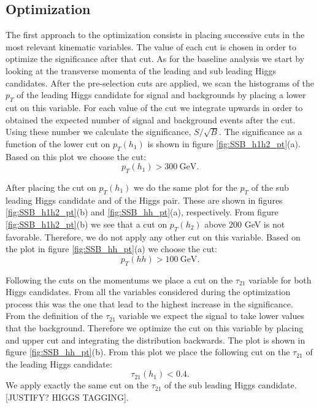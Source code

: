 \subsection{Optimization}
\label{sec:opt}



The first approach to the optimization consists in placing successive cuts in the most relevant kinematic variables. The value of each cut is chosen in order to optimize the significance after that cut. As for the baseline analysis we start by looking at the transverse momenta of the leading and sub leading Higgs candidates. After the pre-selection cuts are applied, we scan the histograms of the $p_T$ of the leading Higgs candidate for signal and backgrounds by placing a lower cut on this variable. For each value of the cut we integrate upwards in order to obtained the expected number of signal and background events after the cut. Using these number we calculate the significance, $S/\sqrt{B}$. The significance as a function of the lower cut on $p_T(h_1)$ is shown in figure \ref{fig:SSB_h1h2_pt}(a). Based on this plot we choose the cut:	
\begin{equation}
	p_T(h_1)>300~\text{GeV}.
\end{equation}

After placing the cut on $p_T(h_1)$ we do the same plot for the $p_T$ of the sub leading Higgs candidate and of the Higgs pair. These are shown in figures \ref{fig:SSB_h1h2_pt}(b) and \ref{fig:SSB_hh_pt}(a), respectively. From figure \ref{fig:SSB_h1h2_pt}(b) we see that a cut on $p_T(h_2)$ above $200$ GeV is not favorable. Therefore, we do not apply any other cut on this variable. Based on the plot in figure \ref{fig:SSB_hh_pt}(a) we choose the cut:
\begin{equation}
	p_T(hh)>100~\text{GeV}.
\end{equation}

Following the cuts on the momentums we place a cut on the $\tau_{21}$ variable for both Higgs candidates. From all the variables considered during the optimization process this was the one that lead to the highest increase in the significance. From the definition of the $\tau_{21}$ variable we expect the signal to take lower values that the background. Therefore we optimize the cut on this variable by placing and upper cut and integrating the distribution backwards. The plot is shown in figure \ref{fig:SSB_hh_pt}(b). From this plot we place the following cut on the $\tau_{21}$ of the leading Higgs candidate:
\begin{equation}
	\tau_{21}(h_1)<0.4.
\end{equation}
We apply exactly the same cut on the $\tau_{21}$ of the sub leading Higgs candidate. [JUSTIFY? HIGGS TAGGING].

